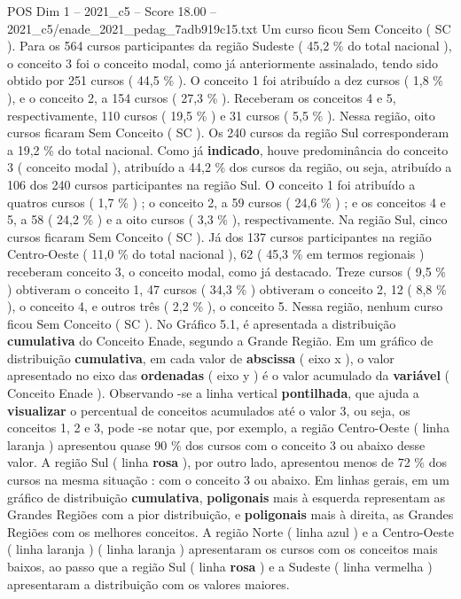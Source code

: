 \begin{textsample}{POS Dim 1 – 2021\_c5 – Score 18.00 – 2021\_c5/enade\_2021\_pedag\_7adb919c15.txt}
Um curso ficou Sem Conceito ( SC ).
Para os 564 cursos participantes da região Sudeste ( 45,2 \% do total nacional ), o conceito 3 foi o conceito modal, como já anteriormente assinalado, tendo sido obtido por 251 cursos ( 44,5 \% ).
O conceito 1 foi atribuído a dez cursos ( 1,8 \% ), e o conceito 2, a 154 cursos ( 27,3 \% ).
Receberam os conceitos 4 e 5, respectivamente, 110 cursos ( 19,5 \% ) e 31 cursos ( 5,5 \% ).
Nessa região, oito cursos ficaram Sem Conceito ( SC ).
Os 240 cursos da região Sul corresponderam a 19,2 \% do total nacional.
Como já \textbf{indicado}, houve predominância do conceito 3 ( conceito modal ), atribuído a 44,2 \% dos cursos da região, ou seja, atribuído a 106 dos 240 cursos participantes na região Sul.
O conceito 1 foi atribuído a quatros cursos ( 1,7 \% ) ; o conceito 2, a 59 cursos ( 24,6 \% ) ; e os conceitos 4 e 5, a 58 ( 24,2 \% ) e a oito cursos ( 3,3 \% ), respectivamente.
Na região Sul, cinco cursos ficaram Sem Conceito ( SC ).
Já dos 137 cursos participantes na região Centro-Oeste ( 11,0 \% do total nacional ), 62 ( 45,3 \% em termos regionais ) receberam conceito 3, o conceito modal, como já destacado.
Treze cursos ( 9,5 \% ) obtiveram o conceito 1, 47 cursos ( 34,3 \% ) obtiveram o conceito 2, 12 ( 8,8 \% ), o conceito 4, e outros três ( 2,2 \% ), o conceito 5.
Nessa região, nenhum curso ficou Sem Conceito ( SC ).
No Gráfico 5.1, é apresentada a distribuição \textbf{cumulativa} do Conceito Enade, segundo a Grande Região.
Em um gráfico de distribuição \textbf{cumulativa}, em cada valor de \textbf{abscissa} ( eixo x ), o valor apresentado no eixo das \textbf{ordenadas} ( eixo y ) é o valor acumulado da \textbf{variável} ( Conceito Enade ).
Observando -se a linha vertical \textbf{pontilhada}, que ajuda a \textbf{visualizar} o percentual de conceitos acumulados até o valor 3, ou seja, os conceitos 1, 2 e 3, pode -se notar que, por exemplo, a região Centro-Oeste ( linha laranja ) apresentou quase 90 \% dos cursos com o conceito 3 ou abaixo desse valor.
A região Sul ( linha \textbf{rosa} ), por outro lado, apresentou menos de 72 \% dos cursos na mesma situação : com o conceito 3 ou abaixo.
Em linhas gerais, em um gráfico de distribuição \textbf{cumulativa}, \textbf{poligonais} mais à esquerda representam as Grandes Regiões com a pior distribuição, e \textbf{poligonais} mais à direita, as Grandes Regiões com os melhores conceitos.
A região Norte ( linha azul ) e a Centro-Oeste ( linha laranja ) ( linha laranja ) apresentaram os cursos com os conceitos mais baixos, ao passo que a região Sul ( linha \textbf{rosa} ) e a Sudeste ( linha vermelha ) apresentaram a distribuição com os valores maiores.

\end{textsample}
